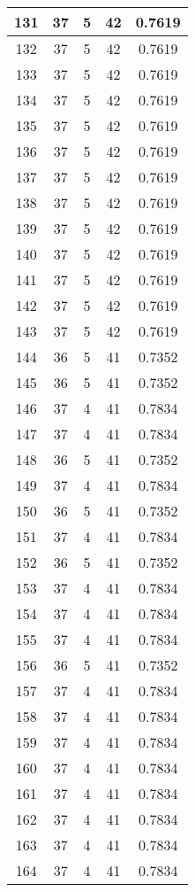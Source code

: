 \documentclass[letterpaper, 12pt]{article}
\begin{document}
\begin{longtable}{|c|c|c|c|c|}
\hline
131 & 37 & 5 & 42 & 0.7619 \\
\hline
132 & 37 & 5 & 42 & 0.7619 \\
\hline
133 & 37 & 5 & 42 & 0.7619 \\
\hline
134 & 37 & 5 & 42 & 0.7619 \\
\hline
135 & 37 & 5 & 42 & 0.7619 \\
\hline
136 & 37 & 5 & 42 & 0.7619 \\
\hline
137 & 37 & 5 & 42 & 0.7619 \\
\hline
138 & 37 & 5 & 42 & 0.7619 \\
\hline
139 & 37 & 5 & 42 & 0.7619 \\
\hline
140 & 37 & 5 & 42 & 0.7619 \\
\hline
141 & 37 & 5 & 42 & 0.7619 \\
\hline
142 & 37 & 5 & 42 & 0.7619 \\
\hline
143 & 37 & 5 & 42 & 0.7619 \\
\hline
144 & 36 & 5 & 41 & 0.7352 \\
\hline
145 & 36 & 5 & 41 & 0.7352 \\
\hline
146 & 37 & 4 & 41 & 0.7834 \\
\hline
147 & 37 & 4 & 41 & 0.7834 \\
\hline
148 & 36 & 5 & 41 & 0.7352 \\
\hline
149 & 37 & 4 & 41 & 0.7834 \\
\hline
150 & 36 & 5 & 41 & 0.7352 \\
\hline
151 & 37 & 4 & 41 & 0.7834 \\
\hline
152 & 36 & 5 & 41 & 0.7352 \\
\hline
153 & 37 & 4 & 41 & 0.7834 \\
\hline
154 & 37 & 4 & 41 & 0.7834 \\
\hline
155 & 37 & 4 & 41 & 0.7834 \\
\hline
156 & 36 & 5 & 41 & 0.7352 \\
\hline
157 & 37 & 4 & 41 & 0.7834 \\
\hline
158 & 37 & 4 & 41 & 0.7834 \\
\hline
159 & 37 & 4 & 41 & 0.7834 \\
\hline
160 & 37 & 4 & 41 & 0.7834 \\
\hline
161 & 37 & 4 & 41 & 0.7834 \\
\hline
162 & 37 & 4 & 41 & 0.7834 \\
\hline
163 & 37 & 4 & 41 & 0.7834 \\
\hline
164 & 37 & 4 & 41 & 0.7834 \\

\end{longtable}
\end{document}
